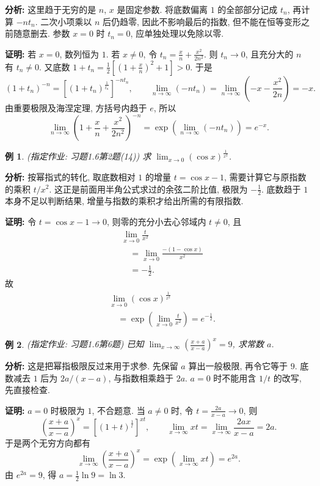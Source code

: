 \documentclass[UTF8,openany]{ctexbook}
\theoremstyle{chinesetextbook}
\newtheorem{example}{例}[section]
\newenvironment{cnproof}{\par\indent\textbf{证明:} \ignorespaces}{\par}
\begin{document}
\par\indent\textbf{分析:} 这里趋于无穷的是 $n$, $x$ 是固定参数. 将底数偏离 $1$ 的全部部分记成 $t_n$, 再计算 $-nt_n$. 二次小项乘以 $n$ 后仍趋零, 因此不影响最后的指数, 但不能在恒等变形之前随意删去. 参数 $x=0$ 时 $t_n=0$, 应单独处理以免除以零.
\begin{cnproof}
若 $x=0$, 数列恒为 $1$. 若 $x\ne0$, 令 $\displaystyle t_n=\frac xn+\frac{x^2}{2n^2}$. 则 $t_n\to0$, 且充分大的 $n$ 有 $t_n\ne0$. 又底数 $\displaystyle 1+t_n=\frac12[(1+\frac xn)^2+1]>0$. 于是
\[
(1+t_n)^{-n}
=\left[(1+t_n)^{\frac1{t_n}}\right]^{-nt_n},
\qquad \lim_{n\to\infty}(-nt_n)=\lim_{n\to\infty}\left(-x-\frac{x^2}{2n}\right)=-x.
\]
由重要极限及海涅定理, 方括号内趋于 $e$, 所以
\[
\lim_{n\to\infty}\left(1+\frac xn+\frac{x^2}{2n^2}\right)^{-n}
=\exp\left(\lim_{n\to\infty}(-nt_n)\right)=e^{-x}.
\]
\end{cnproof}
\begin{example}
(指定作业: 习题1.6第2题(14)) 求 $\displaystyle \lim_{x\to0}(\cos x)^{\frac1{x^2}}$.
\end{example}
\par\indent\textbf{分析:} 按幂指式的转化, 取底数相对 $1$ 的增量 $t=\cos x-1$, 需要计算它与原指数的乘积 $\displaystyle t/x^2$. 这正是前面用半角公式求过的余弦二阶比值, 极限为 $\displaystyle-\frac12$. 底数趋于 $1$ 本身不足以判断结果, 增量与指数的乘积才给出所需的有限指数.
\begin{cnproof}
令 $t=\cos x-1\to0$, 则零的充分小去心邻域内 $t\ne0$, 且
\[
\begin{aligned}
&\lim_{x\to0}\frac{t}{x^2}\\
&\quad=\lim_{x\to0}\frac{-(1-\cos x)}{x^2}\\
&\quad=-\frac12.
\end{aligned}
\]
故
\[
\begin{aligned}
&\lim_{x\to0}(\cos x)^{\frac1{x^2}}\\
&\quad=\exp\left(\lim_{x\to0}\frac{t}{x^2}\right)=e^{-\frac12}.
\end{aligned}
\]
\end{cnproof}
\begin{example}
(指定作业: 习题1.6第6题) 已知 $\displaystyle \lim_{x\to\infty}(\frac{x+a}{x-a})^x=9$, 求常数 $a$.
\end{example}
\par\indent\textbf{分析:} 这是把幂指极限反过来用于求参. 先保留 $a$ 算出一般极限, 再令它等于 $9$. 底数减去 $1$ 后为 $2a/(x-a)$, 与指数相乘趋于 $2a$. $a=0$ 时不能用含 $1/t$ 的改写, 先直接检查.
\begin{cnproof}
$a=0$ 时极限为 $1$, 不合题意. 当 $a\ne0$ 时, 令 $\displaystyle t=\frac{2a}{x-a}\to0$, 则
\[
\left(\frac{x+a}{x-a}\right)^x
=\left[(1+t)^{\frac1t}\right]^{xt},
\qquad \lim_{x\to\infty}xt=\lim_{x\to\infty}\frac{2ax}{x-a}=2a.
\]
于是两个无穷方向都有
\[
\lim_{x\to\infty}\left(\frac{x+a}{x-a}\right)^x
=\exp\left(\lim_{x\to\infty}xt\right)=e^{2a}.
\]
由 $e^{2a}=9$, 得 $\displaystyle a=\frac12\ln9=\ln3$.
\end{cnproof}
\end{document}
